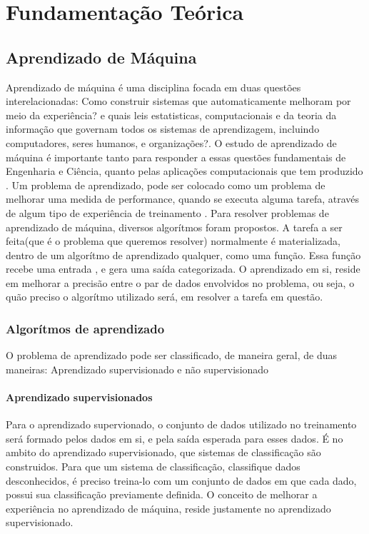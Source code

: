 \part{Fundamentação Teórica}

\chapter{Aprendizado de Máquina}
Aprendizado de máquina é uma disciplina focada em duas questões interelacionadas: Como construir sistemas que automaticamente melhoram por meio da experiência? e quais  leis estatisticas,
computacionais e da teoria da informação que governam todos os sistemas de aprendizagem, incluindo computadores, seres humanos, e organizações?. O estudo de aprendizado de máquina é importante tanto
para responder a essas questões fundamentais de Engenharia e Ciência, quanto pelas aplicações computacionais que tem produzido \cite{Jordan}.
Um problema de aprendizado, pode ser colocado como um problema de melhorar uma medida de performance, quando se executa alguma tarefa, através de algum tipo de experiência de treinamento \cite{Jordan}.
Para resolver problemas de aprendizado de máquina, diversos algorítmos foram propostos. A tarefa a ser feita(que é o problema que queremos resolver) normalmente é materializada, dentro de um algorítmo de aprendizado qualquer, como uma função.
Essa função recebe uma entrada , e gera uma saída categorizada. O aprendizado em si, reside em melhorar a precisão entre o par de dados envolvidos no problema, ou seja, o quão preciso o algorítmo utilizado será, em resolver a tarefa em questão.

\section{Algorítmos de aprendizado}

O problema de aprendizado pode ser classificado, de maneira geral, de duas maneiras: Aprendizado supervisionado e não supervisionado

\subsection{Aprendizado supervisionados}
Para o aprendizado supervionado, o conjunto de dados utilizado no treinamento será formado pelos dados em si, e pela saída esperada para esses dados\cite{Louridas}. É no ambito do aprendizado supervisionado,
que sistemas de classificação são construidos. Para que um sistema de classificação, classifique dados desconhecidos, é preciso treina-lo com um conjunto de dados em que cada dado, possui sua classificação previamente definida.
O conceito de melhorar a experiência no aprendizado de máquina, reside justamente no aprendizado supervisionado.

